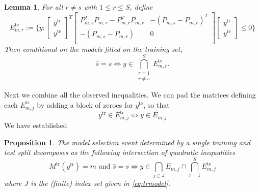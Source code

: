 \documentclass[preprint]{imsart}
\newtheorem{lem}{Lemma}[section]
\newtheorem{prop}{Proposition}[section]
\newcommand{\tr}{\text{tr}}
\newcommand{\te}{\text{te}}
\begin{document}
\begin{lem}
  For all $r \neq s$ with $1 \leq r \leq S$, define
  \begin{equation}
    \label{eq:mintestsets}
    E^\te_{m,r} := \{ y :
    \begin{bmatrix}
      y^\tr \\ y^\te 
    \end{bmatrix}^T
    \begin{bmatrix}
      P_{m,s}^T P_{m,s} - P_{m,r}^T P_{m,r} & -(P_{m,s}-P_{m,r})^T \\
      -(P_{m,s}-P_{m,r}) & 0 \\
    \end{bmatrix}
    \begin{bmatrix}
      y^\tr \\ y^\te 
    \end{bmatrix}
    \leq 0 \}
  \end{equation}
  Then conditional on the models fitted on the training set,
  \begin{equation}
    \label{eq:mintestevent}
    \hat s = s \iff y \in \bigcap_{\substack{r=1 \\ r \neq s}}^S E^\te_{m,r}.
  \end{equation}
\end{lem}

Next we combine all the observed inequalities. We can pad the matrices
defining each $E^\tr_{m,j}$ by adding a block of zeroes for $y^\te$,
so that 
\[
y^\tr \in E^\tr_{m,j} \iff y \in E_{m,j}
\]
We have established
\begin{prop}
\label{prop:traintest}
  The model selection event determined by a single training and test
  split decomposes as the following intersection of quadratic
  inequalities
  \begin{equation}
    \label{eq:mintestevent}
     M^\tr(y^\tr)= m \text{ and } \hat s = s 
    \iff
    y \in \bigcap_{j \in J} E_{m,j} \cap \bigcap_{r=1}^S E^\te_{m,j}
  \end{equation}
  where $J$ is the (finite) index set given in \eqref{eq:trmodel}.
\end{prop}
\end{document}
